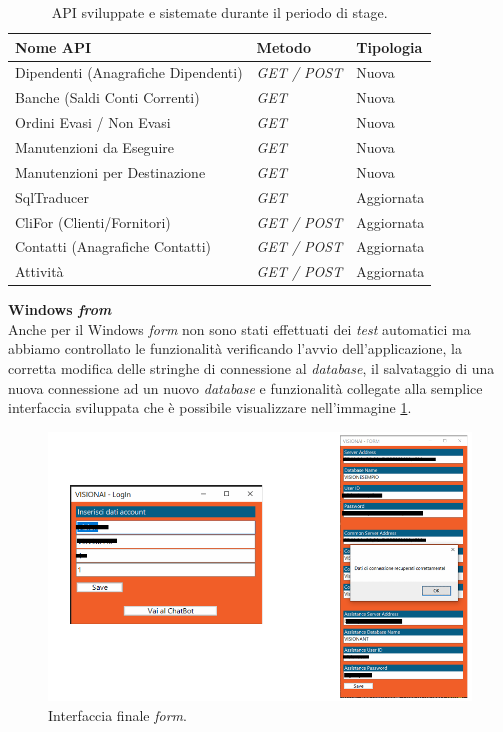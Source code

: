 \begin{table}[H]
\centering
\begin{tabular}{|p{5cm}|p{3cm}|p{4cm}|}
\hline
\textbf{Nome API} & \textbf{Metodo} & \textbf{Tipologia} \\
\hline
Dipendenti (Anagrafiche Dipendenti) & \textit{GET / POST} & Nuova \\
\hline
Banche (Saldi Conti Correnti) & \textit{GET} & Nuova \\
\hline
Ordini Evasi / Non Evasi & \textit{GET} & Nuova \\
\hline
Manutenzioni da Eseguire & \textit{GET} & Nuova \\
\hline
Manutenzioni per Destinazione & \textit{GET} & Nuova \\
\hline
SqlTraducer & \textit{GET} & Aggiornata \\
\hline
CliFor (Clienti/Fornitori) & \textit{GET / POST} & Aggiornata \\
\hline
Contatti (Anagrafiche Contatti) & \textit{GET / POST} & Aggiornata \\
\hline
Attivit\`a & \textit{GET / POST} & Aggiornata \\
\hline
\end{tabular}
\caption{API sviluppate e sistemate durante il periodo di stage.}
\label{tab:api-sviluppate}
\end{table}


\textbf{Windows \textit{from}}\\
Anche per il Windows \textit{form} non sono stati effettuati dei \textit{test} automatici ma abbiamo controllato le funzionalità verificando l'avvio dell'applicazione, la corretta modifica delle stringhe di connessione al \textit{database}, il salvataggio di una nuova connessione ad un nuovo \textit{database} e funzionalità collegate alla semplice interfaccia sviluppata che è possibile visualizzare nell'immagine \ref{fig:interfaccia-form}.

\begin{figure}[H]
    \centering
    \includegraphics[width=\textwidth]{thesis/files/img/FORM-FINALE.PNG}
    \caption{Interfaccia finale \textit{form}.}
    \label{fig:interfaccia-form}
\end{figure}



